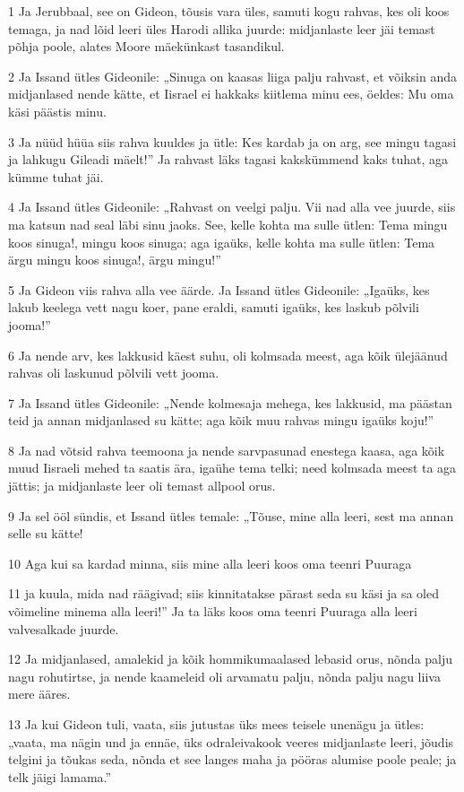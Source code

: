 \par 1 Ja Jerubbaal, see on Gideon, tõusis vara üles, samuti kogu rahvas, kes oli koos temaga, ja nad lõid leeri üles Harodi allika juurde: midjanlaste leer jäi temast põhja poole, alates Moore mäekünkast tasandikul.
\par 2 Ja Issand ütles Gideonile: „Sinuga on kaasas liiga palju rahvast, et võiksin anda midjanlased nende kätte, et Iisrael ei hakkaks kiitlema minu ees, öeldes: Mu oma käsi päästis minu.
\par 3 Ja nüüd hüüa siis rahva kuuldes ja ütle: Kes kardab ja on arg, see mingu tagasi ja lahkugu Gileadi mäelt!” Ja rahvast läks tagasi kakskümmend kaks tuhat, aga kümme tuhat jäi.
\par 4 Ja Issand ütles Gideonile: „Rahvast on veelgi palju. Vii nad alla vee juurde, siis ma katsun nad seal läbi sinu jaoks. See, kelle kohta ma sulle ütlen: Tema mingu koos sinuga!, mingu koos sinuga; aga igaüks, kelle kohta ma sulle ütlen: Tema ärgu mingu koos sinuga!, ärgu mingu!”
\par 5 Ja Gideon viis rahva alla vee äärde. Ja Issand ütles Gideonile: „Igaüks, kes lakub keelega vett nagu koer, pane eraldi, samuti igaüks, kes laskub põlvili jooma!”
\par 6 Ja nende arv, kes lakkusid käest suhu, oli kolmsada meest, aga kõik ülejäänud rahvas oli laskunud põlvili vett jooma.
\par 7 Ja Issand ütles Gideonile: „Nende kolmesaja mehega, kes lakkusid, ma päästan teid ja annan midjanlased su kätte; aga kõik muu rahvas mingu igaüks koju!”
\par 8 Ja nad võtsid rahva teemoona ja nende sarvpasunad enestega kaasa, aga kõik muud Iisraeli mehed ta saatis ära, igaühe tema telki; need kolmsada meest ta aga jättis; ja midjanlaste leer oli temast allpool orus.
\par 9 Ja sel ööl sündis, et Issand ütles temale: „Tõuse, mine alla leeri, sest ma annan selle su kätte!
\par 10 Aga kui sa kardad minna, siis mine alla leeri koos oma teenri Puuraga
\par 11 ja kuula, mida nad räägivad; siis kinnitatakse pärast seda su käsi ja sa oled võimeline minema alla leeri!” Ja ta läks koos oma teenri Puuraga alla leeri valvesalkade juurde.
\par 12 Ja midjanlased, amalekid ja kõik hommikumaalased lebasid orus, nõnda palju nagu rohutirtse, ja nende kaameleid oli arvamatu palju, nõnda palju nagu liiva mere ääres.
\par 13 Ja kui Gideon tuli, vaata, siis jutustas üks mees teisele unenägu ja ütles: „vaata, ma nägin und ja ennäe, üks odraleivakook veeres midjanlaste leeri, jõudis telgini ja tõukas seda, nõnda et see langes maha ja pööras alumise poole peale; ja telk jäigi lamama.”
